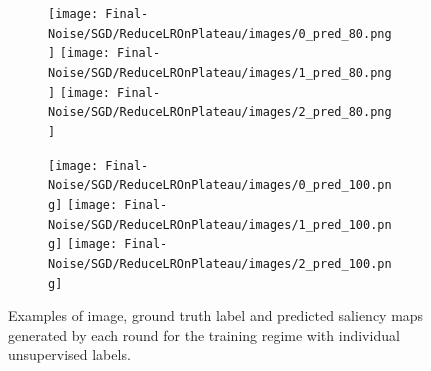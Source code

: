 \documentclass{article}
\begin{document}
\begin{figure}[h]
  \begin{subfigure}[c]{0.12\textwidth}
    \centering
      \texttt{[image: Final-Noise/SGD/ReduceLROnPlateau/images/0\_pred\_80.png]}
      \texttt{[image: Final-Noise/SGD/ReduceLROnPlateau/images/1\_pred\_80.png]}
      \texttt{[image: Final-Noise/SGD/ReduceLROnPlateau/images/2\_pred\_80.png]}
  \end{subfigure}
  \begin{subfigure}[c]{0.12\textwidth}
    \centering
      \texttt{[image: Final-Noise/SGD/ReduceLROnPlateau/images/0\_pred\_100.png]}
      \texttt{[image: Final-Noise/SGD/ReduceLROnPlateau/images/1\_pred\_100.png]}
      \texttt{[image: Final-Noise/SGD/ReduceLROnPlateau/images/2\_pred\_100.png]}
  \end{subfigure}
  \caption{Examples of image, ground truth label and predicted saliency maps generated by each round for the training regime with individual unsupervised labels.}
  \label{fig:n_ablation_sm}
\end{figure}
\end{document}
